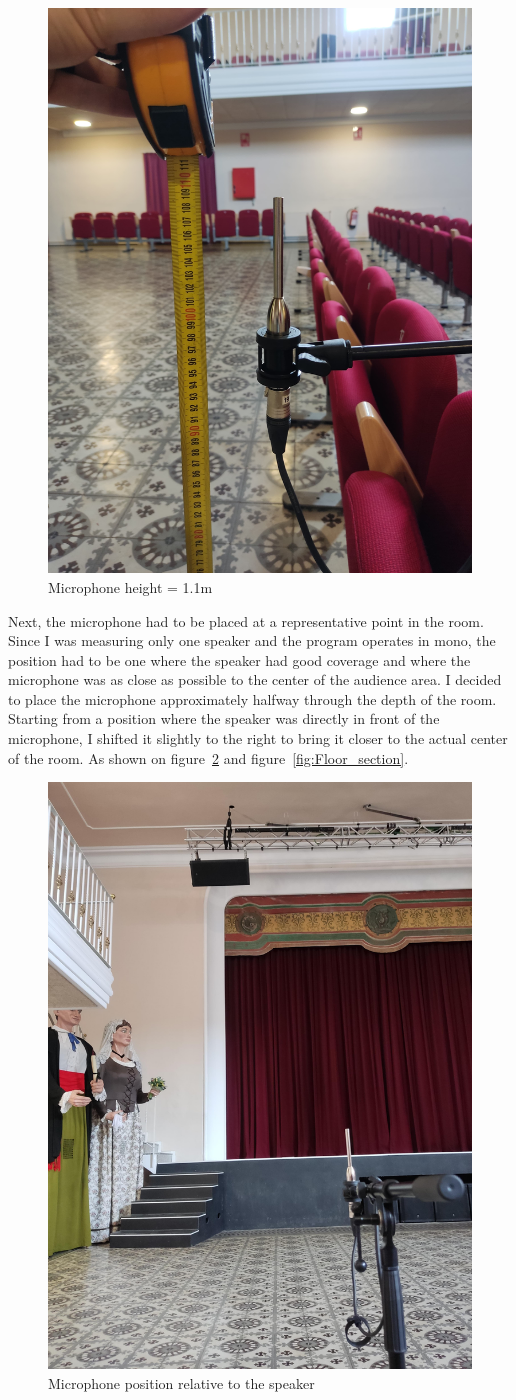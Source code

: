 \begin{figure}[H]
	\centering
	\includegraphics[width=0.6
	\linewidth]{Figures/Coro_micpos2.jpeg}
	\caption{Microphone height = 1.1m}
	\label{fig:Mic_pos2}
\end{figure}

Next, the microphone had to be placed at a representative point in the room. Since I was measuring only one speaker and the program operates in mono, the position had to be one where the speaker had good coverage and where the microphone was as close as possible to the center of the audience area. I decided to place the microphone approximately halfway through the depth of the room. Starting from a position where the speaker was directly in front of the microphone, I shifted it slightly to the right to bring it closer to the actual center of the room. As shown on figure~\ref{fig:Mic_pos3} and figure~\ref{fig:Floor_section}.
\begin{figure}[H]
	\centering
	\includegraphics[width=0.6
	\linewidth]{Figures/Coro_micpos3.jpeg}
	\caption{Microphone position relative to the speaker}
	\label{fig:Mic_pos3}
\end{figure}

